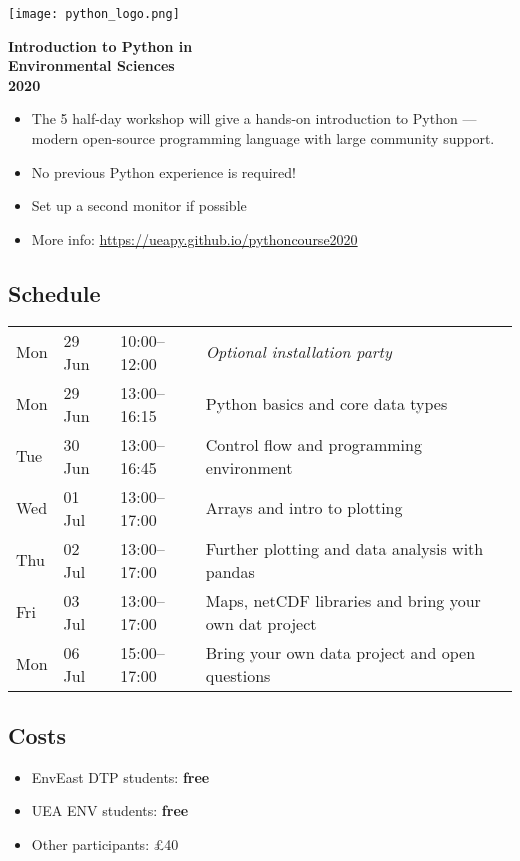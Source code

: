 \documentclass[paper=a4]{scrartcl}
\newcommand*{\pyitem}{\item [{\texttt{[image: python\_logo.png]}}]}
\begin{document}
\pagestyle{empty} %

\begin{center}
\begin{minipage}{0.2\linewidth}
    \texttt{[image: python\_logo.png]}
    \vspace{0.5cm}
\end{minipage}

\huge \textbf{Introduction to Python in \\ Environmental Sciences \\ 2020}

\end{center}

\begin{itemize}
\pyitem The 5 half-day workshop will give a hands-on introduction to Python --- modern open-source programming language with large community support.
\pyitem No previous Python experience is required!
\pyitem Set up a second monitor if possible
\pyitem More info: \url{https://ueapy.github.io/pythoncourse2020}
\end{itemize}


\subsection*{Schedule}
\begin{center}
\begin{tabular}{llll}
Mon & 29 Jun & 10:00--12:00 & \textit {Optional installation party}\\
Mon & 29 Jun & 13:00--16:15 & Python basics and core data types\\
Tue & 30 Jun  & 13:00--16:45 & Control flow and programming environment \\
Wed & 01 Jul & 13:00--17:00 & Arrays and intro to plotting\\
Thu & 02 Jul & 13:00--17:00 & Further plotting and data analysis with pandas\\
Fri & 03 Jul & 13:00--17:00 & Maps, netCDF libraries and bring your own dat project\\
Mon & 06 Jul & 15:00--17:00 & Bring your own data project and open questions\\

\end{tabular}
\end{center}

\subsection*{Costs}
\begin{itemize}
\pyitem EnvEast DTP students: \textbf{free}
\pyitem UEA ENV students: \textbf{free}
\pyitem Other participants: \pounds 40
\end{itemize}
\vspace{-0.5cm}
\end{document}

